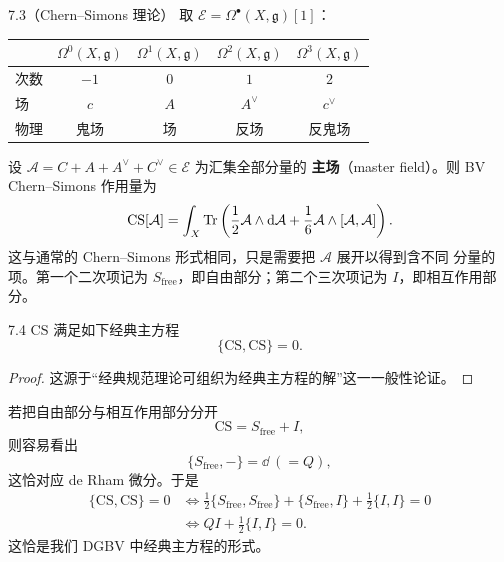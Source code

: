 

\begin{wexam}{7.3}（Chern--Simons 理论）
  取 $\mathcal{E}=\Omega^{\bullet}(X,\mathfrak{g})[1]$：
  \begin{center}
    \begin{tabular}{lcccc}
      \toprule
       & $\Omega^0(X,\mathfrak{g})$ & $\Omega^1(X,\mathfrak{g})$
       & $\Omega^2(X,\mathfrak{g})$ & $\Omega^3(X,\mathfrak{g})$\\
      \midrule
      次数 & $-1$ & $0$ & $1$ & $2$\\
      场 & $c$ & $A$ & $A^{\vee}$ & $c^{\vee}$\\
      物理 & 鬼场 & 场 & 反场 & 反鬼场\\
      \bottomrule
    \end{tabular}
  \end{center}
  设 $\mathcal{A}=C+A+A^{\vee}+C^{\vee}\in\mathcal{E}$ 为汇集全部分量的
  \textbf{主场}（master field）。则 BV Chern--Simons 作用量为
  \[
    \mathrm{CS}[\mathcal{A}]=\int_X\operatorname{Tr}\left(\frac{1}{2}\mathcal{A}\wedge \mathrm{d}\mathcal{A}
    +\frac{1}{6}\mathcal{A}\wedge[\mathcal{A},\mathcal{A}]\right).
  \]
  这与通常的 Chern--Simons 形式相同，只是需要把 $\mathcal{A}$ 展开以得到含不同
  分量的项。第一个二次项记为 $S_{\mathrm{free}}$，即自由部分；第二个三次项记为
  $I$，即相互作用部分。
\end{wexam}

\begin{wprop}{7.4}
  $\mathrm{CS}$ 满足如下经典主方程
  \[
    \{\mathrm{CS},\mathrm{CS}\}=0.
  \]
\end{wprop}

\begin{proof}
  这源于“经典规范理论可组织为经典主方程的解”这一一般性论证。
\end{proof}

若把自由部分与相互作用部分分开
\[
  \mathrm{CS}=S_{\mathrm{free}}+I,
\]
则容易看出
\[
  \{S_{\mathrm{free}},-\}=\dd\ (=Q),
\]
这恰对应 de Rham 微分。于是
\[
  \begin{aligned}
    \{\mathrm{CS},\mathrm{CS}\}=0
    &\iff \frac{1}{2}\{S_{\mathrm{free}},S_{\mathrm{free}}\}
      +\{S_{\mathrm{free}},I\}+\frac{1}{2}\{I,I\}=0\\
    &\iff QI+\frac{1}{2}\{I,I\}=0.
  \end{aligned}
\]
这恰是我们 DGBV 中经典主方程的形式。

